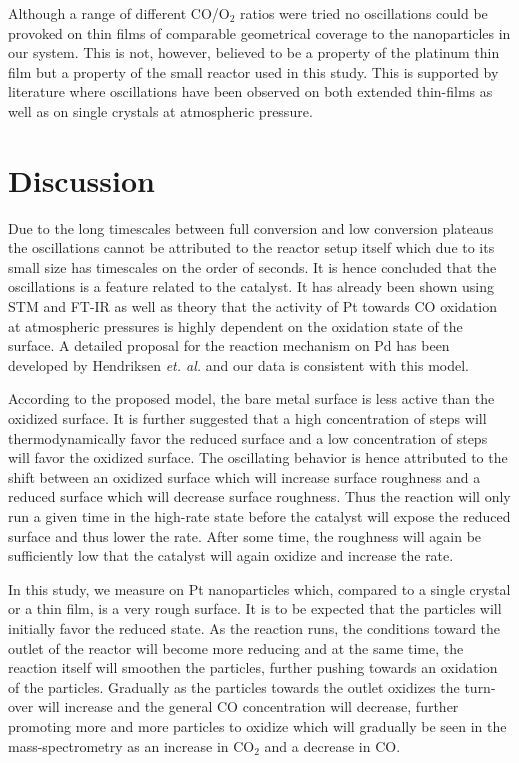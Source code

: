 \documentclass[8.5pt,twoside,twocolumn]{article}
\begin{document}
Although a range of different CO/O$_2$ ratios were tried no oscillations could be provoked on thin films of comparable geometrical coverage to the nanoparticles in our system. This is not, however, believed to be a property of the platinum thin film but a property of the small reactor used in this study. This is supported by literature where oscillations have been observed on both extended thin-films \cite{Singh2010} as well as on single crystals \cite{Hendriksen2005} at atmospheric pressure.

\section{Discussion}
Due to the long timescales between full conversion and low conversion plateaus the oscillations cannot be attributed to the reactor setup itself which due to its small size has timescales on the order of seconds. It is hence concluded that the oscillations is a feature related to the catalyst. It has already been shown using STM \cite{Hendriksen2002} and FT-IR \cite{Carlsson2006} as well as theory \cite{Gong2004} that the activity of Pt towards CO oxidation at atmospheric pressures is highly dependent on the oxidation state of the surface. A detailed proposal for the reaction mechanism on Pd has been developed by Hendriksen \textit{et. al.}\cite{Hendriksen2010} and our data is consistent with this model.

According to the proposed model, the bare metal surface is less active than the oxidized surface. It is further suggested that a high concentration of steps will thermodynamically favor the reduced surface and a low concentration of steps will favor the oxidized surface. The oscillating behavior is hence attributed to the shift between an oxidized surface which will increase surface roughness and a reduced surface which will decrease surface roughness. Thus the reaction will only run a given time in the high-rate state before the catalyst will expose the reduced surface and thus lower the rate. After some time, the roughness will again be sufficiently low that the catalyst will again oxidize and increase the rate.

In this study, we measure on Pt nanoparticles which, compared to a single crystal or a thin film, is a very rough surface. It is to be expected that the particles will initially favor the reduced state. As the reaction runs, the conditions toward the outlet of the reactor will become more reducing and at the same time, the reaction itself will smoothen the particles, further pushing towards an oxidation of the particles. Gradually as the particles towards the outlet oxidizes the turn-over will increase and the general CO concentration will decrease, further promoting more and more particles to oxidize which will gradually be seen in the mass-spectrometry as an increase in CO$_2$ and a decrease in CO. 
\end{document}
